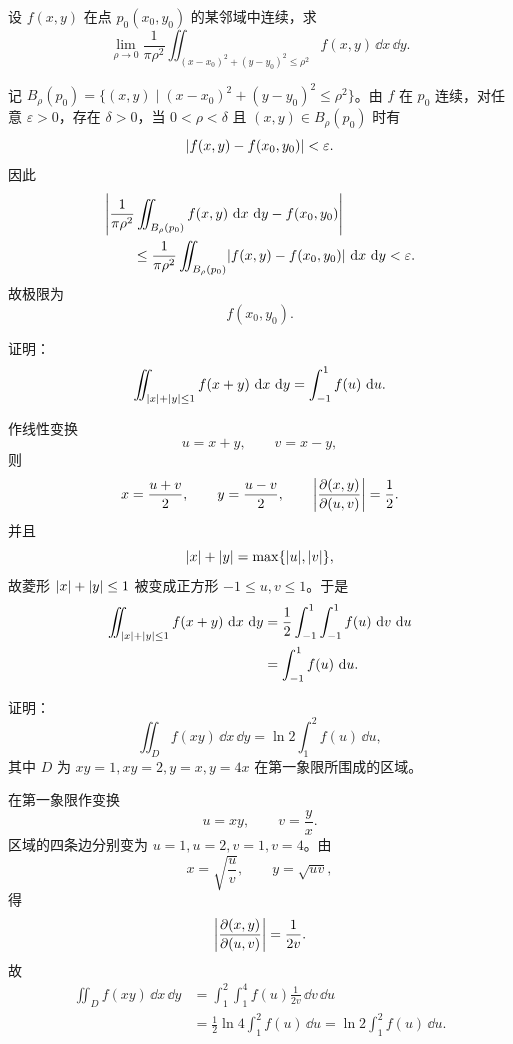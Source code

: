 \begin{xexercise}[2]
设 $f(x,y)$ 在点 $p_0(x_0,y_0)$ 的某邻域中连续，求
  \[
    \lim_{\rho\to0}\frac1{\pi\rho^2}
    \iint_{(x-x_0)^2+(y-y_0)^2\le\rho^2}f(x,y)\,\dd x\,\dd y.
  \]
\end{xexercise}
\begin{xsolution}
记 $B_\rho(p_0)=\{(x,y)\mid(x-x_0)^2+(y-y_0)^2\le\rho^2\}$。由 $f$ 在 $p_0$ 连续，对任意 $\varepsilon>0$，存在 $\delta>0$，当 $0<\rho<\delta$ 且 $(x,y)\in B_\rho(p_0)$ 时有
\[
  \abs{f(x,y)-f(x_0,y_0)}<\varepsilon.
\]
因此
\begin{align*}
 &\abs*{\frac1{\pi\rho^2}\iint_{B_\rho(p_0)}f(x,y)\,\dd x\,\dd y-f(x_0,y_0)}\\
 &\qquad\le\frac1{\pi\rho^2}\iint_{B_\rho(p_0)}\abs{f(x,y)-f(x_0,y_0)}\,\dd x\,\dd y<\varepsilon.
\end{align*}
故极限为
\[
  \boxed{f(x_0,y_0)}.
\]
\end{xsolution}


\begin{xexercise}[3]
证明：
  \[
    \iint_{\abs{x}+\abs{y}\le1} f(x+y)\,\dd x\,\dd y
    =\int_{-1}^1 f(u)\,\dd u.
  \]
\end{xexercise}
\begin{xsolution}
作线性变换
\[
  u=x+y,\qquad v=x-y,
\]
则
\[
  x=\frac{u+v}{2},\qquad y=\frac{u-v}{2},\qquad
  \abs*{\frac{\partial(x,y)}{\partial(u,v)}}=\frac12.
\]
并且
\[
  \abs{x}+\abs{y}=\max\{\abs{u},\abs{v}\},
\]
故菱形 $\abs{x}+\abs{y}\le1$ 被变成正方形 $-1\le u,v\le1$。于是
\begin{align*}
  \iint_{\abs{x}+\abs{y}\le1}f(x+y)\,\dd x\,\dd y
  &=\frac12\int_{-1}^1\int_{-1}^1 f(u)\,\dd v\,\dd u\\
  &=\int_{-1}^1f(u)\,\dd u.
\end{align*}
\end{xsolution}


\begin{xexercise}[4]
证明：
  \[
    \iint_D f(xy)\,\dd x\,\dd y=\ln2\int_1^2 f(u)\,\dd u,
  \]
  其中 $D$ 为 $xy=1,xy=2,y=x,y=4x$ 在第一象限所围成的区域。
\end{xexercise}
\begin{xsolution}
在第一象限作变换
\[
  u=xy,\qquad v=\frac yx.
\]
区域的四条边分别变为 $u=1,u=2,v=1,v=4$。由
\[
  x=\sqrt{\frac uv},\qquad y=\sqrt{uv},
\]
得
\[
  \abs*{\frac{\partial(x,y)}{\partial(u,v)}}=\frac1{2v}.
\]
故
\begin{align*}
  \iint_Df(xy)\,\dd x\,\dd y
  &=\int_1^2\int_1^4 f(u)\frac1{2v}\,\dd v\,\dd u\\
  &=\frac12\ln4\int_1^2f(u)\,\dd u
  =\ln2\int_1^2f(u)\,\dd u.
\end{align*}
\end{xsolution}


